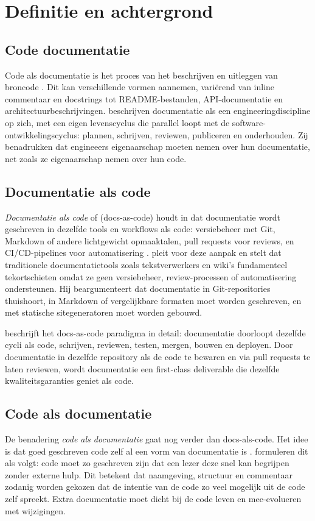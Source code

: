 \section{Definitie en achtergrond}
\label{sec:cad-definitie}

\subsection{Code documentatie}
Code als documentatie is het proces van het beschrijven en uitleggen van broncode \autocite{bhatti2021docsdevelopers}.
Dit kan verschillende vormen aannemen, vari\"{e}rend van inline commentaar en docstrings tot README-bestanden, API-documentatie en architectuurbeschrijvingen.
\textcite{bhatti2021docsdevelopers} beschrijven documentatie als een engineeringdiscipline op zich, met een eigen levenscyclus die parallel loopt met de software-ontwikkelingscyclus: plannen, schrijven, reviewen, publiceren en onderhouden.
Zij benadrukken dat engineeers eigenaarschap moeten nemen over hun documentatie, net zoals ze eigenaarschap nemen over hun code.

\subsection{Documentatie als code}
\textit{Documentatie als code} of (docs-as-code) houdt in dat documentatie wordt geschreven in dezelfde tools en workflows als code: versiebeheer met Git, Markdown of andere lichtgewicht opmaaktalen, pull requests voor reviews, en CI/CD-pipelines voor automatisering \autocite{gentle2017docslikecode}.
\textcite{etter2016moderntechwriting} pleit voor deze aanpak en stelt dat traditionele documentatietools zoals tekstverwerkers en wiki's fundamenteel tekortschieten omdat ze geen versiebeheer, review-processen of automatisering ondersteunen.
Hij beargumenteert dat documentatie in Git-repositories thuishoort, in Markdown of vergelijkbare formaten moet worden geschreven, en met statische sitegeneratoren moet worden gebouwd.

\textcite{gentle2017docslikecode} beschrijft het docs-as-code paradigma in detail: documentatie doorloopt dezelfde cycli als code, schrijven, reviewen, testen, mergen, bouwen en deployen.
Door documentatie in dezelfde repository als de code te bewaren en via pull requests te laten reviewen, wordt documentatie een first-class deliverable die dezelfde kwaliteitsgaranties geniet als code.

\subsection{Code als documentatie}
De benadering \textit{code als documentatie} gaat nog verder dan docs-als-code.
Het idee is dat goed geschreven code zelf al een vorm van documentatie is \autocite{boswell2011readablecode}.
\textcite{boswell2011readablecode} formuleren dit als volgt: code moet zo geschreven zijn dat een lezer deze snel kan begrijpen zonder externe hulp.
Dit betekent dat naamgeving, structuur en commentaar zodanig worden gekozen dat de intentie van de code zo veel mogelijk uit de code zelf spreekt.
Extra documentatie moet dicht bij de code leven en mee-evolueren met wijzigingen.

